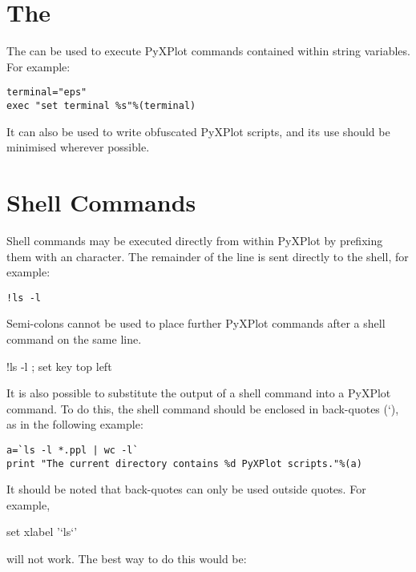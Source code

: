\section{The }

The  can be used to execute PyXPlot commands contained within
string variables. For example:

\begin{verbatim}
terminal="eps"
exec "set terminal %s"%(terminal)
\end{verbatim}

\noindent It can also be used to write obfuscated PyXPlot scripts, and its use
should be minimised wherever possible.

\section{Shell Commands}

Shell commands may be executed directly from
within PyXPlot by prefixing them with an \indcmdts{!} character. The
remainder of the line is sent directly to the shell, for example:

\begin{verbatim}
!ls -l
\end{verbatim}

\noindent Semi-colons cannot be used to place further PyXPlot commands after a
shell command on the same line.

\begin{dontdo}
!ls -l ; set key top left
\end{dontdo}

It is also possible to substitute the output of a shell command into a PyXPlot
command. To do this, the shell command should be enclosed in back-quotes (`),
as in the following example:

\begin{verbatim}
a=`ls -l *.ppl | wc -l`
print "The current directory contains %d PyXPlot scripts."%(a)
\end{verbatim}

It should be noted that back-quotes can only be used outside quotes. For
example,

\begin{dontdo}
set xlabel '`ls`'
\end{dontdo}

\noindent will not work. The best way to do this would be:

